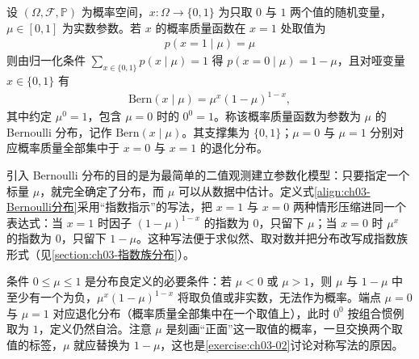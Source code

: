 \documentclass[../../main.tex]{subfiles}
\begin{document}
\begin{definition}[Bernoulli 分布]\label{definition:ch03-Bernoulli分布}
设 $(\Omega,\mathcal{F},\mathbb{P})$ 为概率空间，$x:\Omega\to\{0,1\}$ 为只取 $0$ 与 $1$ 两个值的随机变量，$\mu\in[0,1]$ 为实数参数。若 $x$ 的概率质量函数在 $x=1$ 处取值为
\begin{align}
p(x=1\mid\mu)=\mu
\label{align:ch03-Bernoulli正面概率}
\end{align}
则由归一化条件 $\sum_{x\in\{0,1\}}p(x\mid\mu)=1$ 得 $p(x=0\mid\mu)=1-\mu$，且对哑变量 $x\in\{0,1\}$ 有
\begin{align}
\mathrm{Bern}(x\mid\mu)=\mu^{x}(1-\mu)^{1-x},
\label{align:ch03-Bernoulli分布}
\end{align}
其中约定 $\mu^{0}=1$，包含 $\mu=0$ 时的 $0^{0}=1$。称该概率质量函数为参数为 $\mu$ 的 Bernoulli 分布，记作 $\mathrm{Bern}(x\mid\mu)$。其支撑集为 $\{0,1\}$；$\mu=0$ 与 $\mu=1$ 分别对应概率质量全部集中于 $x=0$ 与 $x=1$ 的退化分布。
\end{definition}

\begin{remark}
引入 Bernoulli 分布的目的是为最简单的二值观测建立参数化模型：只要指定一个标量 $\mu$，就完全确定了分布，而 $\mu$ 可以从数据中估计。定义式\eqref{align:ch03-Bernoulli分布}采用“指数指示”的写法，把 $x=1$ 与 $x=0$ 两种情形压缩进同一个表达式：当 $x=1$ 时因子 $(1-\mu)^{1-x}$ 的指数为 $0$，只留下 $\mu$；当 $x=0$ 时 $\mu^{x}$ 的指数为 $0$，只留下 $1-\mu$。这种写法便于求似然、取对数并把分布改写成指数族形式（见\cref{section:ch03-指数族分布}）。

条件 $0\leqslant\mu\leqslant1$ 是分布良定义的必要条件：若 $\mu<0$ 或 $\mu>1$，则 $\mu$ 与 $1-\mu$ 中至少有一个为负，$\mu^{x}(1-\mu)^{1-x}$ 将取负值或非实数，无法作为概率。端点 $\mu=0$ 与 $\mu=1$ 对应退化分布（概率质量全部集中在一个取值上），此时 $0^{0}$ 按组合惯例取为 $1$，定义仍然自洽。注意 $\mu$ 是刻画“正面”这一取值的概率，一旦交换两个取值的标签，$\mu$ 就应替换为 $1-\mu$，这也是\cref{exercise:ch03-02}讨论对称写法的原因。
\end{remark}
\end{document}
